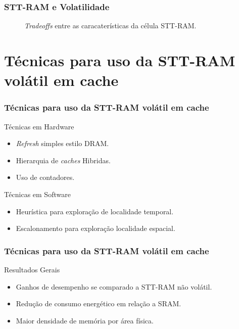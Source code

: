 \documentclass[10pt, pdf,xcolor=pdftex,dvipsnames,table]{beamer}
\begin{document}
\frame
{
\frametitle{STT-RAM e Volatilidade}
	\begin{figure}[!h]
	 \centering
	 	\caption{\textit{Tradeoffs} entre as caracaterísticas da célula STT-RAM.}
	 	\label{fig:we}
	 \end{figure}	
}

\section{Técnicas para uso da STT-RAM volátil em cache}

\frame
{
\frametitle{Técnicas para uso da STT-RAM volátil em cache}
		\begin{block}{Técnicas em Hardware}
			\begin{itemize}
				\item \textit{Refresh} simples estilo DRAM.
				\item Hierarquia de \textit{caches} Hibridas.
				\item Uso de contadores.
			\end{itemize}	 
		\end{block}
		\begin{block}{Técnicas em Software}
			\begin{itemize}
				\item Heurística para exploração de localidade temporal.
				\item Escalonamento para exploração localidade espacial.
			\end{itemize}
		\end{block}
}

\frame
{
\frametitle{Técnicas para uso da STT-RAM volátil em cache}
		\begin{block}{Resultados Gerais}
			\begin{itemize}
				\item Ganhos de desempenho se comparado a STT-RAM não volátil.
				\item Redução de consumo energético em relação a SRAM.
				\item Maior densidade de memória por área física.
			\end{itemize}	 
		\end{block}
}
\end{document}
